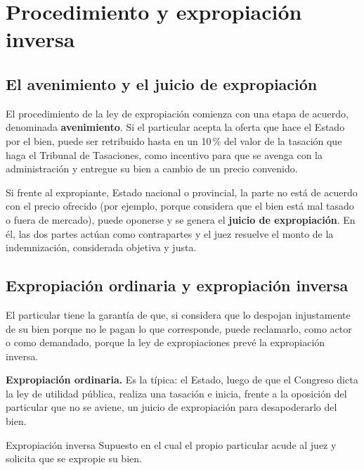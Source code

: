 \documentclass[12pt,oneside]{book}
\begin{document}
\section{Procedimiento y expropiación inversa}

\subsection{El avenimiento y el juicio de expropiación}

El procedimiento de la ley de expropiación comienza con una etapa de acuerdo, denominada \textbf{avenimiento}. Si el particular acepta la oferta que hace el Estado por el bien, puede ser retribuido hasta en un 10\,\% del valor de la tasación que haga el Tribunal de Tasaciones, como incentivo para que se avenga con la administración y entregue su bien a cambio de un precio convenido.

Si frente al expropiante, Estado nacional o provincial, la parte no está de acuerdo con el precio ofrecido (por ejemplo, porque considera que el bien está mal tasado o fuera de mercado), puede oponerse y se genera el \textbf{juicio de expropiación}. En él, las dos partes actúan como contrapartes y el juez resuelve el monto de la indemnización, considerada objetiva y justa.

\subsection{Expropiación ordinaria y expropiación inversa}

El particular tiene la garantía de que, si considera que lo despojan injustamente de su bien porque no le pagan lo que corresponde, puede reclamarlo, como actor o como demandado, porque la ley de expropiaciones prevé la expropiación inversa.

\textbf{Expropiación ordinaria.} Es la típica: el Estado, luego de que el Congreso dicta la ley de utilidad pública, realiza una tasación e inicia, frente a la oposición del particular que no se aviene, un juicio de expropiación para desapoderarlo del bien.

\begin{definition}{Expropiación inversa}
Supuesto en el cual el propio particular acude al juez y solicita que se expropie su bien.
\end{definition}
\end{document}
